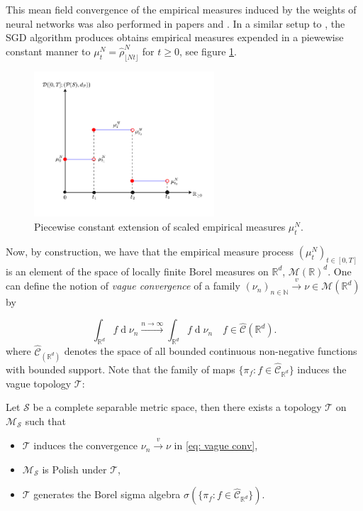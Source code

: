 \documentclass{article}
\theoremstyle{mystyle}
\newcommand{\N}{\ensuremath{\mathbb{N}}}
\newcommand{\R}{\ensuremath{\mathbb{R}}}
\newcommand{\diff}{\ensuremath{\operatorname{d}\!}}
\begin{document}
This mean field convergence of the empirical measures induced by the weights of neural networks was also performed in papers \cite{sirignano2019meanfieldanalysisclt} and \cite{sirignano2019meanfieldanalysislln}. In a similar setup to \cite{Mei_2018}, the SGD algorithm produces obtains empirical measures expended in a piewewise constant manner to $\mu^{N}_{t} = \hat{\rho}^{N}_{\lfloor Nt \rfloor}$ for $ t\geq 0$, see figure \ref{fig: piecewise constant extension of function}. 
\begin{figure}[H]
    \centering
    \includegraphics[width=0.6\textwidth]{images/piecewise-constant.png}
    \caption{Piecewise constant extension of scaled empirical measures $ \mu^{N}_{t}$.}
    \label{fig: piecewise constant extension of function}
\end{figure}

Now, by construction, we have that the empirical measure process $ (\mu^{N}_{t})_{t\in [0,T]}$ is an element of the space of locally finite Borel measures on $ \R^{d}$, $ \mathcal{M}(\R)^{d}$. One can define the notion of \textit{vague convergence} of a family $ (\nu_{n})_{n\in \N} \stackrel{v}{\to} \nu\in \mathcal{M}(\R^{d})$ by 

\begin{equation}\label{eq: vague conv}
	\int_{\R^{d}}f \diff \nu_{n}\stackrel{n\to \infty}{\to} \int_{\R^{d}}f \diff \nu_{n} \quad  f\in \hat{\mathcal{C}}(\R^{d}).
\end{equation}
where $ \hat{\mathcal{C}}_(\R^{d})$ denotes the space of all bounded continuous non-negative functions with bounded support. Note that the family of maps $\{\pi_{f}:f\in \hat {\mathcal{C}}_{\R^{d}}\} $ induces the vague topology $ \mathcal{T}$: 

\begin{boxlemma}\label{lemma: vague topology}
Let $  \mathcal{S}$ be a complete separable metric space, then there exists a topology $  \mathcal{T}$ on $  \mathcal{M}_{ \mathcal{ S}}$ such that
\begin{itemize}
\item $ \mathcal{T}$ induces the convergence $ \nu_{n}\stackrel{v}{\longrightarrow}\nu$ in \ref{eq: vague conv},
\item $ \mathcal{M}_{ \mathcal{S}}$ is Polish under $  \mathcal{T}$,
\item $  \mathcal{T}$ generates the Borel sigma algebra $\sigma(\{\pi_{f}:f\in \hat {\mathcal{C}}_{\R^{d}}\})$.
\end{itemize}

\end{boxlemma}
\end{document}
